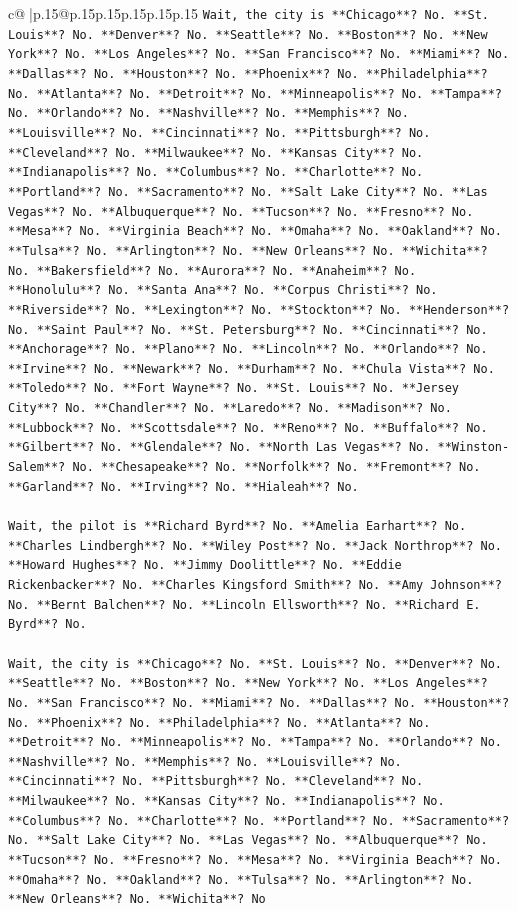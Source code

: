 \documentclass{article}
\begin{document}
{\begin{supertabular}{c@{$\;$}|p{.15\linewidth}@{}p{.15\linewidth}p{.15\linewidth}p{.15\linewidth}p{.15\linewidth}p{.15\linewidth}}
{{{\texttt{Wait, the city is **Chicago**? No. **St. Louis**? No. **Denver**? No. **Seattle**? No. **Boston**? No. **New York**? No. **Los Angeles**? No. **San Francisco**? No. **Miami**? No. **Dallas**? No. **Houston**? No. **Phoenix**? No. **Philadelphia**? No. **Atlanta**? No. **Detroit**? No. **Minneapolis**? No. **Tampa**? No. **Orlando**? No. **Nashville**? No. **Memphis**? No. **Louisville**? No. **Cincinnati**? No. **Pittsburgh**? No. **Cleveland**? No. **Milwaukee**? No. **Kansas City**? No. **Indianapolis**? No. **Columbus**? No. **Charlotte**? No. **Portland**? No. **Sacramento**? No. **Salt Lake City**? No. **Las Vegas**? No. **Albuquerque**? No. **Tucson**? No. **Fresno**? No. **Mesa**? No. **Virginia Beach**? No. **Omaha**? No. **Oakland**? No. **Tulsa**? No. **Arlington**? No. **New Orleans**? No. **Wichita**? No. **Bakersfield**? No. **Aurora**? No. **Anaheim**? No. **Honolulu**? No. **Santa Ana**? No. **Corpus Christi**? No. **Riverside**? No. **Lexington**? No. **Stockton**? No. **Henderson**? No. **Saint Paul**? No. **St. Petersburg**? No. **Cincinnati**? No. **Anchorage**? No. **Plano**? No. **Lincoln**? No. **Orlando**? No. **Irvine**? No. **Newark**? No. **Durham**? No. **Chula Vista**? No. **Toledo**? No. **Fort Wayne**? No. **St. Louis**? No. **Jersey City**? No. **Chandler**? No. **Laredo**? No. **Madison**? No. **Lubbock**? No. **Scottsdale**? No. **Reno**? No. **Buffalo**? No. **Gilbert**? No. **Glendale**? No. **North Las Vegas**? No. **Winston{-}Salem**? No. **Chesapeake**? No. **Norfolk**? No. **Fremont**? No. **Garland**? No. **Irving**? No. **Hialeah**? No.} \\
\\ 
\texttt{Wait, the pilot is **Richard Byrd**? No. **Amelia Earhart**? No. **Charles Lindbergh**? No. **Wiley Post**? No. **Jack Northrop**? No. **Howard Hughes**? No. **Jimmy Doolittle**? No. **Eddie Rickenbacker**? No. **Charles Kingsford Smith**? No. **Amy Johnson**? No. **Bernt Balchen**? No. **Lincoln Ellsworth**? No. **Richard E. Byrd**? No.} \\
\\ 
\texttt{Wait, the city is **Chicago**? No. **St. Louis**? No. **Denver**? No. **Seattle**? No. **Boston**? No. **New York**? No. **Los Angeles**? No. **San Francisco**? No. **Miami**? No. **Dallas**? No. **Houston**? No. **Phoenix**? No. **Philadelphia**? No. **Atlanta**? No. **Detroit**? No. **Minneapolis**? No. **Tampa**? No. **Orlando**? No. **Nashville**? No. **Memphis**? No. **Louisville**? No. **Cincinnati**? No. **Pittsburgh**? No. **Cleveland**? No. **Milwaukee**? No. **Kansas City**? No. **Indianapolis**? No. **Columbus**? No. **Charlotte**? No. **Portland**? No. **Sacramento**? No. **Salt Lake City**? No. **Las Vegas**? No. **Albuquerque**? No. **Tucson**? No. **Fresno**? No. **Mesa**? No. **Virginia Beach**? No. **Omaha**? No. **Oakland**? No. **Tulsa**? No. **Arlington**? No. **New Orleans**? No. **Wichita**? No} \\
            }
        }
    }
     \\ \\


\end{supertabular}}
\end{document}
